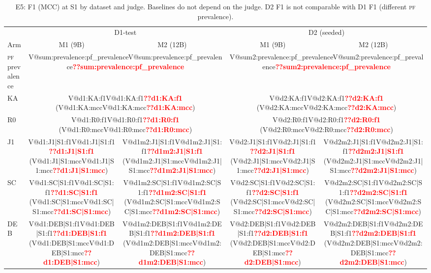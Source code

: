 \documentclass[pdflatex,iicol,sn-mathphys-num]{sn-jnl}
\makeatletter
\newcommand{\V}[1]{\ifcsname V@#1\endcsname\csname V@#1\endcsname\else\textbf{\textcolor{red}{??#1}}\fi}
\newcommand{\PF}{\textsc{pf}}
\makeatother
\begin{document}
\begin{appendices}
\begin{table}[!htb]
\caption{E5: F1 (MCC) at S1 by dataset and judge. Baselines do not depend on the judge. D2 F1 is not comparable with D1 F1 (different \PF{} prevalence).}\label{tab:robust}
\footnotesize
\begin{tabular}{@{}l c c c c@{}}
\toprule
 & \multicolumn{2}{c}{D1-test} & \multicolumn{2}{c}{D2 (seeded)} \\
\cmidrule(lr){2-3}\cmidrule(lr){4-5}
Arm & M1 (9B) & M2 (12B) & M1 (9B) & M2 (12B) \\
\midrule
\PF{} prevalence & \multicolumn{2}{c}{\V{sum:prevalence:pf_prevalence}} & \multicolumn{2}{c}{\V{sum2:prevalence:pf_prevalence}} \\
KA & \multicolumn{2}{c}{\V{d1:KA:f1} (\V{d1:KA:mcc})} & \multicolumn{2}{c}{\V{d2:KA:f1} (\V{d2:KA:mcc})} \\
R0 & \multicolumn{2}{c}{\V{d1:R0:f1} (\V{d1:R0:mcc})} & \multicolumn{2}{c}{\V{d2:R0:f1} (\V{d2:R0:mcc})} \\
J1 & \V{d1:J1|S1:f1} (\V{d1:J1|S1:mcc}) & \V{d1m2:J1|S1:f1} (\V{d1m2:J1|S1:mcc}) & \V{d2:J1|S1:f1} (\V{d2:J1|S1:mcc}) & \V{d2m2:J1|S1:f1} (\V{d2m2:J1|S1:mcc}) \\
SC & \V{d1:SC|S1:f1} (\V{d1:SC|S1:mcc}) & \V{d1m2:SC|S1:f1} (\V{d1m2:SC|S1:mcc}) & \V{d2:SC|S1:f1} (\V{d2:SC|S1:mcc}) & \V{d2m2:SC|S1:f1} (\V{d2m2:SC|S1:mcc}) \\
DEB & \V{d1:DEB|S1:f1} (\V{d1:DEB|S1:mcc}) & \V{d1m2:DEB|S1:f1} (\V{d1m2:DEB|S1:mcc}) & \V{d2:DEB|S1:f1} (\V{d2:DEB|S1:mcc}) & \V{d2m2:DEB|S1:f1} (\V{d2m2:DEB|S1:mcc}) \\
\bottomrule
\end{tabular}
\end{table}



\end{appendices}
\end{document}
